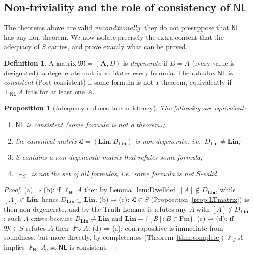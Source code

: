 \documentclass[12pt]{article}
\newtheorem{proposition}{Proposition}
\theoremstyle{definition}
\newtheorem{definition}{Definition}
\newcommand{\NL}{\mathsf{NL}}
\newcommand{\prv}{\vdash_{\NL}}
\newcommand{\vld}{\vDash}
\newcommand{\Fm}{\mathrm{Fm}}
\newcommand{\A}{\mathbf{A}}
\newcommand{\Lin}{\mathbf{Lin}}
\begin{document}
\subsection*{Non-triviality and the role of consistency of $\NL$}

The theorems above are valid \emph{unconditionally}: they do not presuppose that
$\NL$ has any non-theorem. We now isolate precisely the extra content that the
adequacy of $S$ carries, and prove exactly what can be proved.

\begin{definition}
A matrix $\mathfrak M=(\A,D)$ is \emph{degenerate} if $D=A$ (every value is
designated); a degenerate matrix validates every formula. The calculus $\NL$ is
\emph{consistent} (Post-consistent) if some formula is not a theorem, equivalently
if $\prv A$ fails for at least one $A$.
\end{definition}

\begin{proposition}[Adequacy reduces to consistency]\label{prop:nontriv}
The following are equivalent:
\begin{enumerate}
\item[(a)] $\NL$ is consistent (some formula is not a theorem);
\item[(b)] the canonical matrix $\mathfrak L=(\Lin,D_{\Lin})$ is non-degenerate,
i.e.\ $D_{\Lin}\neq\Lin$;
\item[(c)] $S$ contains a non-degenerate matrix that refutes some formula;
\item[(d)] $\,\vld_{S}\,$ is not the set of \emph{all} formulas, i.e.\ some
formula is not $S$-valid.
\end{enumerate}
\end{proposition}

\begin{proof}
(a)$\Rightarrow$(b): if $\not\prv A$ then by Lemma~\ref{lem:Dwelldef}
$[A]\notin D_{\Lin}$, while $[A]\in\Lin$; hence $D_{\Lin}\subsetneq\Lin$.
(b)$\Rightarrow$(c): $\mathfrak L\in S$ (Proposition~\ref{prop:LTmatrix}) is then
non-degenerate, and by the Truth Lemma it refutes any $A$ with
$[A]\notin D_{\Lin}$; such $A$ exists because $D_{\Lin}\neq\Lin$ and
$\Lin=\{[B]:B\in\Fm\}$. (c)$\Rightarrow$(d): if $\mathfrak M\in S$ refutes $A$
then $\not\vld_{S}A$. (d)$\Rightarrow$(a): contrapositive is immediate from
soundness, but more directly, by completeness (Theorem~\ref{thm:complete})
$\not\vld_{S}A$ implies $\not\prv A$, so $\NL$ is consistent.
\end{proof}
\end{document}
